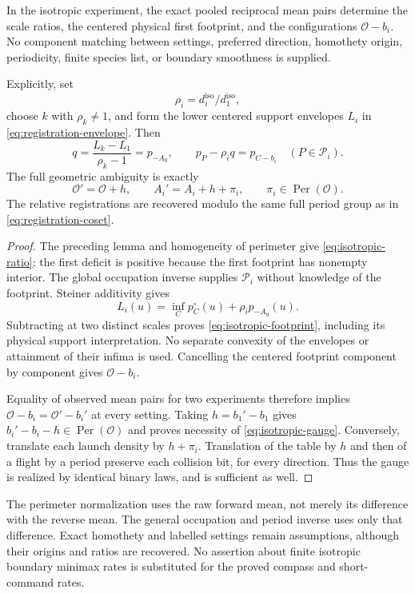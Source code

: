 \begin{theorem}
\label{thm:isotropic-registration}
In the isotropic experiment, the exact pooled reciprocal mean pairs
determine the scale ratios, the centered physical first footprint,
and the configurations $\mathcal O-b_i$. No component matching
between settings, preferred direction, homothety origin, periodicity,
finite species list, or boundary smoothness is supplied.

Explicitly, set
\begin{equation}\label{eq:isotropic-ratio}
                   \rho_i=d_i^{\mathrm{iso}}/d_1^{\mathrm{iso}},
\end{equation}
choose $k$ with $\rho_k\ne1$, and form the lower centered support
envelopes $L_i$ in \eqref{eq:registration-envelope}. Then
\begin{equation}\label{eq:isotropic-footprint}
 q=\frac{L_k-L_1}{\rho_k-1}=p_{-A_0},\qquad
                   p_P-\rho_iq=p_{C-b_i}\quad(P\in\mathcal P_i).
\end{equation}
The full geometric ambiguity is exactly
\begin{equation}\label{eq:isotropic-gauge}
 \mathcal O'=\mathcal O+h,\qquad
 A_i'=A_i+h+\pi_i,\qquad \pi_i\in\operatorname{Per}(\mathcal O).
\end{equation}
The relative registrations are recovered modulo the same full period
group as in \eqref{eq:registration-coset}.
\end{theorem}
\begin{proof}
The preceding lemma and homogeneity of perimeter give
\eqref{eq:isotropic-ratio}; the first deficit is positive because
the first footprint has nonempty interior. The global occupation
inverse supplies $\mathcal P_i$ without knowledge of the footprint.
Steiner additivity gives
\[
 L_i(u)=\inf_C p_C^\circ(u)+\rho_i p_{-A_0}(u).
\]
Subtracting at two distinct scales proves
\eqref{eq:isotropic-footprint}, including its physical support
interpretation. No separate convexity of the envelopes or attainment
of their infima is used. Cancelling the centered footprint component
by component gives $\mathcal O-b_i$.

Equality of observed mean pairs for two experiments therefore implies
$\mathcal O-b_i=\mathcal O'-b_i'$ at every setting. Taking
$h=b_1'-b_1$ gives $b_i'-b_i-h\in\operatorname{Per}(\mathcal O)$
and proves necessity of \eqref{eq:isotropic-gauge}. Conversely,
translate each launch density by $h+\pi_i$. Translation of the table
by $h$ and then of a flight by a period preserve each collision bit,
for every direction. Thus the gauge is realized by identical binary
laws, and is sufficient as well.
\end{proof}

The perimeter normalization uses the raw forward mean, not merely its
difference with the reverse mean. The general occupation and period
inverse uses only that difference. Exact homothety and labelled
settings remain assumptions, although their origins and ratios are
recovered. No assertion about finite isotropic boundary minimax rates
is substituted for the proved compass and short-command rates.
